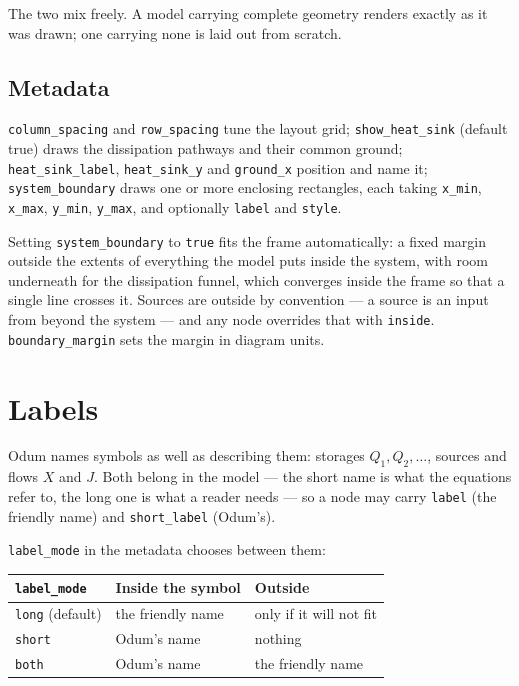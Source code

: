 \documentclass{article}
\begin{document}
The two mix freely. A model carrying complete geometry renders exactly as it was
drawn; one carrying none is laid out from scratch.

\subsection{Metadata}

\texttt{column\_spacing} and \texttt{row\_spacing} tune the layout grid;
\texttt{show\_heat\_sink} (default true) draws the dissipation pathways and
their common ground; \texttt{heat\_sink\_label}, \texttt{heat\_sink\_y} and
\texttt{ground\_x} position and name it; \texttt{system\_boundary} draws one or more enclosing
rectangles, each taking \texttt{x\_min}, \texttt{x\_max}, \texttt{y\_min},
\texttt{y\_max}, and optionally \texttt{label} and \texttt{style}.

Setting \texttt{system\_boundary} to \texttt{true} fits the frame
automatically: a fixed margin outside the extents of everything the model puts
inside the system, with room underneath for the dissipation funnel, which
converges inside the frame so that a single line crosses it. Sources are outside
by convention --- a source is an input from beyond the system --- and any node
overrides that with \texttt{inside}. \texttt{boundary\_margin} sets the margin
in diagram units.

\section{Labels}

Odum names symbols as well as describing them: storages $Q_1, Q_2, \ldots$,
sources and flows $X$ and $J$. Both belong in the model --- the short name is
what the equations refer to, the long one is what a reader needs --- so a node
may carry \texttt{label} (the friendly name) and \texttt{short\_label} (Odum's).

\texttt{label\_mode} in the metadata chooses between them:

\begin{table}[h]
\centering
\begin{tabular}{lll}
\toprule
\texttt{label\_mode} & Inside the symbol & Outside \\
\midrule
\texttt{long} (default) & the friendly name & only if it will not fit \\
\texttt{short}          & Odum's name       & nothing \\
\texttt{both}           & Odum's name       & the friendly name \\
\bottomrule
\end{tabular}
\end{table}
\end{document}
